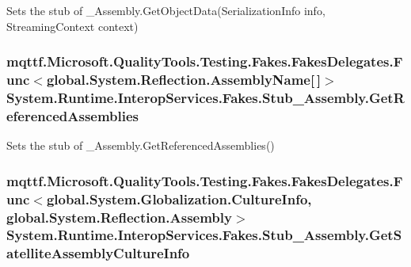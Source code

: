 Sets the stub of \-\_\-\-Assembly.\-Get\-Object\-Data(\-Serialization\-Info info, Streaming\-Context context)

\hypertarget{class_system_1_1_runtime_1_1_interop_services_1_1_fakes_1_1_stub___assembly_aa58ecc6e2c61a71dab0cff6687ad5932}{
\subsubsection[{Get\-Referenced\-Assemblies}]{\setlength{\rightskip}{0pt plus 5cm}mqttf.\-Microsoft.\-Quality\-Tools.\-Testing.\-Fakes.\-Fakes\-Delegates.\-Func$<$global.\-System.\-Reflection.\-Assembly\-Name\mbox{[}$\,$\mbox{]}$>$ System.\-Runtime.\-Interop\-Services.\-Fakes.\-Stub\-\_\-\-Assembly.\-Get\-Referenced\-Assemblies}}\label{class_system_1_1_runtime_1_1_interop_services_1_1_fakes_1_1_stub___assembly_aa58ecc6e2c61a71dab0cff6687ad5932}


Sets the stub of \-\_\-\-Assembly.\-Get\-Referenced\-Assemblies()

\hypertarget{class_system_1_1_runtime_1_1_interop_services_1_1_fakes_1_1_stub___assembly_ab34b0d6d51d1991dfd06565feaa00f94}{
\subsubsection[{Get\-Satellite\-Assembly\-Culture\-Info}]{\setlength{\rightskip}{0pt plus 5cm}mqttf.\-Microsoft.\-Quality\-Tools.\-Testing.\-Fakes.\-Fakes\-Delegates.\-Func$<$global.\-System.\-Globalization.\-Culture\-Info, global.\-System.\-Reflection.\-Assembly$>$ System.\-Runtime.\-Interop\-Services.\-Fakes.\-Stub\-\_\-\-Assembly.\-Get\-Satellite\-Assembly\-Culture\-Info}}\label{class_system_1_1_runtime_1_1_interop_services_1_1_fakes_1_1_stub___assembly_ab34b0d6d51d1991dfd06565feaa00f94}


